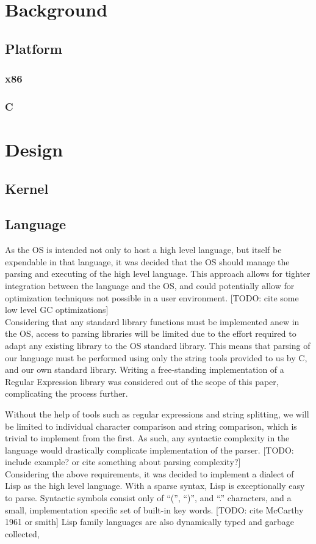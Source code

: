 \documentclass{report}
\begin{document}
\chapter{Background}


\section{Platform}

\subsection{x86}

\subsection{C}


\chapter{Design}

\section{Kernel}

\section{Language}
As the OS is intended not only to host a high level language, but itself be expendable in that language, it was decided that the OS should manage the parsing and executing of the high level language. This approach allows for tighter integration between the language and the OS, and could potentially allow for optimization techniques not possible in a user environment. [TODO: cite some low level GC optimizations]
\\
Considering that any standard library functions must be implemented anew in the OS, access to parsing libraries will be limited due to the effort required to adapt any existing library to the OS standard library. This means that parsing of our language must be performed using only the string tools provided to us by C, and our own standard library. Writing a free-standing implementation of a Regular Expression library was considered out of the scope of this paper, complicating the process further.

Without the help of tools such as regular expressions and string splitting, we will be limited to individual character comparison and string comparison, which is trivial to implement from the first. As such, any syntactic complexity in the language would drastically complicate implementation of the parser. [TODO: include example? or cite something about parsing complexity?]
\\
Considering the above requirements, it was decided to implement a dialect of Lisp as the high level language. With a sparse syntax, Lisp is exceptionally easy to parse. Syntactic symbols consist only of ``('', ``)'', and ``.'' characters, and a small, implementation specific set of built-in key words. [TODO: cite McCarthy 1961 or smith] Lisp family languages are also dynamically typed and garbage collected,
\end{document}
